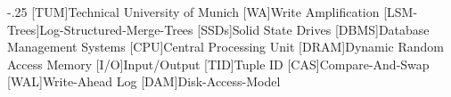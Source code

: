 \documentclass[headsepline,footsepline,footinclude=false,oneside,fontsize=11pt,paper=a4,listof=totoc,bibliography=totoc]{scrbook} %
\begin{document}


\frontmatter{}





\tableofcontents{}

\mainmatter{}










\appendix{}



\begin{acronym}
	\itemsep-.25\baselineskip
	[TUM]{Technical University of Munich}
	[WA]{Write Amplification}
	[LSM-Trees]{Log-Structured-Merge-Trees}
	[SSDs]{Solid State Drives}
	[DBMS]{Database Management Systems}
	[CPU]{Central Processing Unit}
	[DRAM]{Dynamic Random Access Memory}
	[I/O]{Input/Output}
	[TID]{Tuple ID}
	[CAS]{Compare-And-Swap}
	[WAL]{Write-Ahead Log}
	[DAM]{Disk-Access-Model}
\end{acronym}

\listoffigures{}
\listoftables{}
\printbibliography{}
\end{document}
